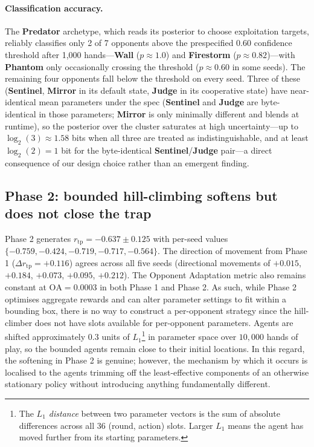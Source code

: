 \documentclass[10pt]{article} %
\newcommand{\arch}[1]{\textbf{#1}}
\newcommand{\rtp}{\ensuremath{r_{\mathrm{tp}}}}
\begin{document}
\paragraph{Classification accuracy.}
The \arch{Predator} archetype, which reads its posterior to
choose exploitation targets, reliably classifies only 2 of 7
opponents above the prespecified 0.60 confidence threshold after
1{,}000 hands---\arch{Wall} ($p \approx 1.0$) and \arch{Firestorm}
($p \approx 0.82$)---with \arch{Phantom} only occasionally crossing
the threshold ($p \approx 0.60$ in some seeds). The remaining four opponents
fall below the threshold on every seed. Three of these
(\arch{Sentinel}, \arch{Mirror} in its default state,
\arch{Judge} in its cooperative state) have near-identical mean
parameters under the spec (\arch{Sentinel} and \arch{Judge} are
byte-identical in those parameters; \arch{Mirror} is only minimally
different and blends at runtime), so the posterior over the cluster saturates at high
uncertainty---up to $\log_2(3) \approx 1.58$ bits when all three are
treated as indistinguishable, and at least $\log_2(2) = 1$ bit for
the byte-identical \arch{Sentinel}/\arch{Judge} pair---a direct
consequence of our design choice rather than an emergent finding.


\subsection{Phase 2: bounded hill-climbing softens but does not
close the trap}

Phase 2 generates $\rtp = -0.637 \pm 0.125$ with per-seed values
$\{-0.759, -0.424, -0.719, -0.717, -0.564\}$. The direction of
movement from Phase 1 ($\Delta\rtp = +0.116$) agrees across all five
seeds (directional movements of $+0.015$, $+0.184$, $+0.073$,
$+0.095$, $+0.212$). The Opponent Adaptation metric also remains
constant at $\mathrm{OA} = 0.0003$ in both Phase 1 and Phase 2. As
such, while Phase 2 optimises aggregate rewards and can alter
parameter settings to fit within a bounding box, there is no way to
construct a per-opponent strategy since the hill-climber does not
have slots available for per-opponent parameters. Agents are shifted
approximately $0.3$ units of $L_1$\footnote{The \textit{$L_1$
distance} between two parameter vectors is the sum of absolute
differences across all 36 (round, action) slots. Larger $L_1$ means
the agent has moved further from its starting parameters.} in
parameter space over $10{,}000$ hands of play, so the bounded agents
remain close to their initial locations. In this regard, the
softening in Phase 2 is genuine; however, the mechanism by which it
occurs is localised to the agents trimming off the least-effective
components of an otherwise stationary policy without introducing
anything fundamentally different.
\end{document}
